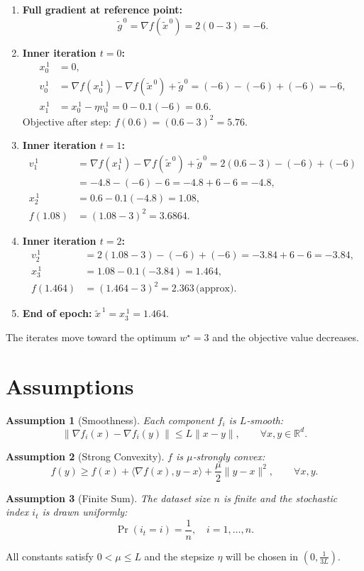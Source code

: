 \documentclass[11pt]{article}
\newtheorem{assumption}{Assumption}[section]
\begin{document}
\begin{enumerate}[label={\arabic*.}]
\item \textbf{Full gradient at reference point:}
\[
\tilde{g}^{\,0}= \nabla f(\tilde{x}^{\,0}) = 2(0-3) = -6 .
\]

\item \textbf{Inner iteration $t=0$:}
\begin{align*}
x_0^{\,1}&=0,\\
v_0^{\,1}&= \nabla f(x_0^{\,1})-\nabla f(\tilde{x}^{\,0})+\tilde{g}^{\,0}
         = (-6)-(-6)+(-6)= -6,\\
x_1^{\,1}&= x_0^{\,1}-\eta v_0^{\,1}=0-0.1(-6)=0.6.
\end{align*}
Objective after step: $f(0.6)=(0.6-3)^2=5.76$.

\item \textbf{Inner iteration $t=1$:}
\begin{align*}
v_1^{\,1}&= \nabla f(x_1^{\,1})-\nabla f(\tilde{x}^{\,0})+\tilde{g}^{\,0}
         = 2(0.6-3)-(-6)+(-6)\\
        &= -4.8-(-6)-6 = -4.8+6-6 = -4.8,\\
x_2^{\,1}&=0.6-0.1(-4.8)=1.08,\\
f(1.08)&=(1.08-3)^2=3.6864.
\end{align*}

\item \textbf{Inner iteration $t=2$:}
\begin{align*}
v_2^{\,1}&= 2(1.08-3)-(-6)+(-6)= -3.84+6-6 = -3.84,\\
x_3^{\,1}&=1.08-0.1(-3.84)=1.464,\\
f(1.464)&=(1.464-3)^2=2.363\,\text{(approx)}.
\end{align*}

\item \textbf{End of epoch:} $\tilde{x}^{\,1}=x_3^{\,1}=1.464$.
\end{enumerate}
The iterates move toward the optimum $w^\star=3$ and the objective value decreases.

\section*{Assumptions}
\begin{assumption}[Smoothness]\label{ass:smooth}
Each component $f_i$ is $L$‑smooth:
\[
\|\nabla f_i(x)-\nabla f_i(y)\|\le L\|x-y\|,\qquad\forall x,y\in\mathbb{R}^d .
\]
\end{assumption}
\begin{assumption}[Strong Convexity]\label{ass:strong}
$f$ is $\mu$‑strongly convex:
\[
f(y)\ge f(x)+\langle\nabla f(x),y-x\rangle+\frac{\mu}{2}\|y-x\|^2,\qquad\forall x,y .
\]
\end{assumption}
\begin{assumption}[Finite Sum]\label{ass:finite}
The dataset size $n$ is finite and the stochastic index $i_t$ is drawn uniformly:
\[
\Pr(i_t=i)=\frac{1}{n},\quad i=1,\dots,n .
\]
\end{assumption}
All constants satisfy $0<\mu\le L$ and the stepsize $\eta$ will be chosen in $(0,\tfrac{1}{3L})$.
\end{document}
